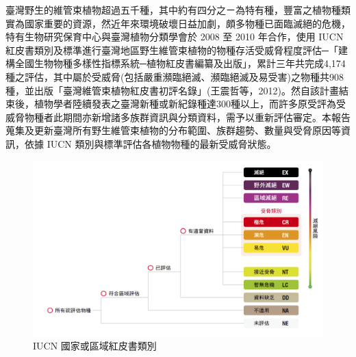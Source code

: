 \begin{multicols}{2}
臺灣野生的維管束植物超過五千種，其中約有四分之ㄧ為特有種，豐富之植物種類實為國家重要的資源，然近年來環境破壞日益加劇，頗多物種已面臨滅絕的危機，特有生物研究保育中心與臺灣植物分類學會於 2008 至 2010 年合作，使用 IUCN 紅皮書類別及標準進行臺灣地區野生維管束植物的物種存活受威脅程度評估─「建構全國生物物種多樣性指標系統─植物紅皮書編纂及出版」，累計三年共完成4,174種之評估，其中屬於受威脅(包括嚴重瀕臨絕滅、瀕臨絕滅及易受害)之物種共908種，並出版「臺灣維管束植物紅皮書初評名錄」(王震哲等，2012)。然自該計畫結束後，植物學者陸續發表之臺灣新種或新紀錄種達300種以上，而許多原受評為受威脅物種者此期間亦新增諸多族群資訊與分類資料，需予以重新評估審定。本報告蒐集及更新臺灣所有野生維管束植物的分布範圍、族群趨勢、數量與受脅原因等資訊，依據 IUCN 類別與標準評估各植物物種的最新受威脅狀態。\\
\end{multicols}
\begin{figure}[!ht]
    \includegraphics[width=\textwidth]{images/fig1.png}
    \caption{IUCN 國家或區域紅皮書類別} \label{fig1}
\end{figure}

%
